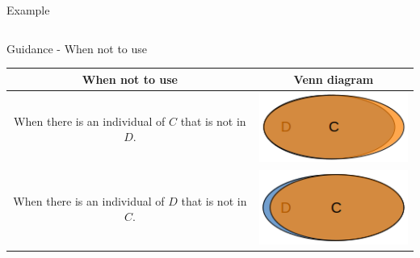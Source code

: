 \documentclass{beamer}
\begin{document}
{\begin{block}{Example}
\begin{table}
\begin{center}
\begin{small}
\begin{tabular}{|c|c|c|}
						\\
						\hline						 				  
					\end{tabular}
				\end{small}
			\end{center}
		\end{table}
	\end{block}
	\begin{block}{Guidance - When not to use}
		\begin{table} 
			\begin{center} 
				\begin{small}
					\begin{tabular}{|c|c|} 
						\hline					
						\textbf{When not to use}&\textbf{Venn diagram}\\
						\hline 
						\begin{minipage}{7.5cm}
							When there is an individual of $C$ that is not in $D$.
						\end{minipage}									
						& 
						\begin{minipage}{3cm}
							\includegraphics[trim = 0mm 0mm 0mm 0mm, clip, scale=0.4]{../../SubClassOf vs EquivalentTo/images/IndividualOfCnotInD.png}
						\end{minipage}										
						\\
						\hline 
						\begin{minipage}{7.5cm}
							When there is an individual of $D$ that is not in $C$.
						\end{minipage}									
						& 
						\begin{minipage}{3cm}
							\includegraphics[trim = 0mm 1mm 0mm 1mm, clip, scale=0.4]{../../SubClassOf vs EquivalentTo/images/IndividualOfDnotInC.png}
						\end{minipage}										
						\\					
						\hline						 				  
					\end{tabular}
				\end{small}
			\end{center}
		\end{table}
	\end{block}
}
\end{document}

